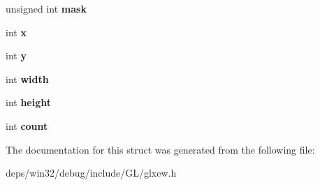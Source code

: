 \begin{DoxyCompactItemize}
\item 
\hypertarget{struct_g_l_x_buffer_clobber_event_s_g_i_x_a74b4ad1ad3cac011001151411f621da1}{}unsigned int {\bfseries mask}\label{struct_g_l_x_buffer_clobber_event_s_g_i_x_a74b4ad1ad3cac011001151411f621da1}

\item 
\hypertarget{struct_g_l_x_buffer_clobber_event_s_g_i_x_a5118d48c3c8d5253d39922b5014b52ff}{}int {\bfseries x}\label{struct_g_l_x_buffer_clobber_event_s_g_i_x_a5118d48c3c8d5253d39922b5014b52ff}

\item 
\hypertarget{struct_g_l_x_buffer_clobber_event_s_g_i_x_aef21efa11558a5b67861f96471c56003}{}int {\bfseries y}\label{struct_g_l_x_buffer_clobber_event_s_g_i_x_aef21efa11558a5b67861f96471c56003}

\item 
\hypertarget{struct_g_l_x_buffer_clobber_event_s_g_i_x_adad23535733161528427584a42bfc6eb}{}int {\bfseries width}\label{struct_g_l_x_buffer_clobber_event_s_g_i_x_adad23535733161528427584a42bfc6eb}

\item 
\hypertarget{struct_g_l_x_buffer_clobber_event_s_g_i_x_a7838dbabb76c22aa8241310a3f2363ea}{}int {\bfseries height}\label{struct_g_l_x_buffer_clobber_event_s_g_i_x_a7838dbabb76c22aa8241310a3f2363ea}

\item 
\hypertarget{struct_g_l_x_buffer_clobber_event_s_g_i_x_ad8f4f0aae058e0a1ff542679823e37a9}{}int {\bfseries count}\label{struct_g_l_x_buffer_clobber_event_s_g_i_x_ad8f4f0aae058e0a1ff542679823e37a9}

\end{DoxyCompactItemize}


The documentation for this struct was generated from the following file\+:\begin{DoxyCompactItemize}
\item 
deps/win32/debug/include/\+G\+L/glxew.\+h\end{DoxyCompactItemize}
